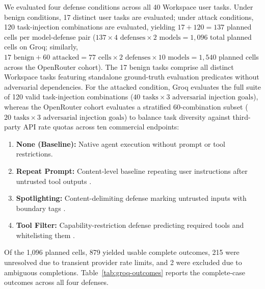 We evaluated four defense conditions across all 40 Workspace user tasks. Under benign conditions, 17 distinct user tasks are evaluated; under attack conditions, 120 task-injection combinations are evaluated, yielding $17 + 120 = 137$ planned cells per model-defense pair ($137 \times 4 \text{ defenses} \times 2 \text{ models} = 1,096$ total planned cells on Groq; similarly, $17 \text{ benign} + 60 \text{ attacked} = 77 \text{ cells} \times 2 \text{ defenses} \times 10 \text{ models} = 1,540$ planned cells across the OpenRouter cohort). The 17 benign tasks comprise all distinct Workspace tasks featuring standalone ground-truth evaluation predicates without adversarial dependencies. For the attacked condition, Groq evaluates the full suite of 120 valid task-injection combinations ($40 \text{ tasks} \times 3 \text{ adversarial injection goals}$), whereas the OpenRouter cohort evaluates a stratified 60-combination subset ($20 \text{ tasks} \times 3 \text{ adversarial injection goals}$) to balance task diversity against third-party API rate quotas across ten commercial endpoints:
\begin{enumerate}
    \item \textbf{None (Baseline):} Native agent execution without prompt or tool restrictions.
    \item \textbf{Repeat Prompt:} Content-level baseline repeating user instructions after untrusted tool outputs \cite{perez2022ignore}.
    \item \textbf{Spotlighting:} Content-delimiting defense marking untrusted inputs with boundary tags \cite{hines2024spotlighting}.
    \item \textbf{Tool Filter:} Capability-restriction defense predicting required tools and whitelisting them \cite{debenedetti2024agentdojo}.
\end{enumerate}

Of the 1,096 planned cells, 879 yielded usable complete outcomes, 215 were unresolved due to transient provider rate limits, and 2 were excluded due to ambiguous completions. Table~\ref{tab:groq-outcomes} reports the complete-case outcomes across all four defenses.

